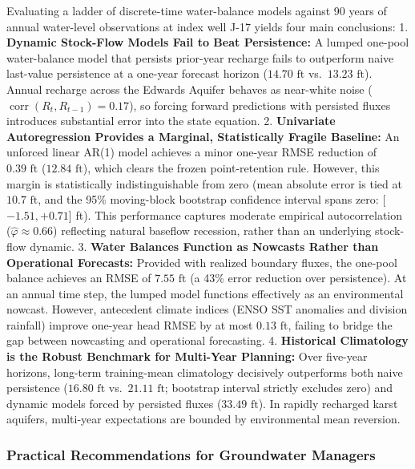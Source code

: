 \documentclass[11pt]{article}
\begin{document}
Evaluating a ladder of discrete-time water-balance models against 90
years of annual water-level observations at index well J-17 yields four
main conclusions: 1. \textbf{Dynamic Stock-Flow Models Fail to Beat
Persistence:} A lumped one-pool water-balance model that persists
prior-year recharge fails to outperform naive last-value persistence at
a one-year forecast horizon (\(14.70\text{ ft}\)
vs.~\(13.23\text{ ft}\)). Annual recharge across the Edwards Aquifer
behaves as near-white noise
(\(\operatorname{corr}(R_t, R_{t-1}) = 0.17\)), so forcing forward
predictions with persisted fluxes introduces substantial error into the
state equation. 2. \textbf{Univariate Autoregression Provides a
Marginal, Statistically Fragile Baseline:} An unforced linear AR(1)
model achieves a minor one-year RMSE reduction of \(0.39\text{ ft}\)
(\(12.84\text{ ft}\)), which clears the frozen point-retention rule.
However, this margin is statistically indistinguishable from zero (mean
absolute error is tied at \(10.7\text{ ft}\), and the 95\% moving-block
bootstrap confidence interval spans zero: {[}\(-1.51, +0.71\){]} ft).
This performance captures moderate empirical autocorrelation
(\(\hat{\varphi} \approx 0.66\)) reflecting natural baseflow recession,
rather than an underlying stock-flow dynamic. 3. \textbf{Water Balances
Function as Nowcasts Rather than Operational Forecasts:} Provided with
realized boundary fluxes, the one-pool balance achieves an RMSE of
\(7.55\text{ ft}\) (a 43\% error reduction over persistence). At an
annual time step, the lumped model functions effectively as an
environmental nowcast. However, antecedent climate indices (ENSO SST
anomalies and division rainfall) improve one-year head RMSE by at most
\(0.13\text{ ft}\), failing to bridge the gap between nowcasting and
operational forecasting. 4. \textbf{Historical Climatology is the Robust
Benchmark for Multi-Year Planning:} Over five-year horizons, long-term
training-mean climatology decisively outperforms both naive persistence
(\(16.80\text{ ft}\) vs.~\(21.11\text{ ft}\); bootstrap interval
strictly excludes zero) and dynamic models forced by persisted fluxes
(\(33.49\text{ ft}\)). In rapidly recharged karst aquifers, multi-year
expectations are bounded by environmental mean reversion.

\subsubsection{Practical Recommendations for Groundwater
Managers}\label{practical-recommendations-for-groundwater-managers}
\end{document}
